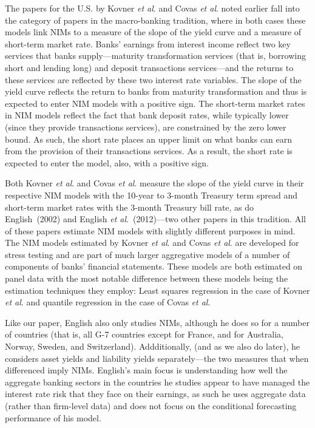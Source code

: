 \documentclass[11pt]{article}
\begin{document}
The papers for the U.S. by Kovner \textit{et al}. and Covas \textit{et al}. noted earlier fall into the category of papers in the macro-banking tradition, where in both cases these models link NIMs to  a measure of the slope of the yield curve and a measure of short-term market rate.  Banks' earnings from interest income reflect two key services that banks supply---maturity transformation services (that is, borrowing short and lending long) and deposit transactions services---and the returns to these services are reflected by these two interest rate variables.  The slope of the yield curve reflects the return to banks from maturity transformation and thus is expected to enter NIM models with a positive sign. The short-term market rates in NIM models reflect the fact that bank deposit rates, while typically lower (since they provide transactions services), are constrained by the zero lower bound.  As such, the short rate places an upper limit on what banks can earn from the provision of their transactions services. As a result, the short rate is expected to enter the model, also, with a positive sign.

Both Kovner \textit{et al}. and Covas \textit{et al}. measure the slope of the yield curve in their respective NIM models with the 10-year to 3-month Treasury term spread and short-term market rates with the 3-month Treasury bill rate, as do English~(2002) and English \textit{et al}.~(2012)---two other papers in this tradition.  All of these papers estimate NIM models with slightly different purposes in mind.  The NIM models estimated by Kovner \textit{et al}. and Covas \textit{et al}. are developed for stress testing and are part of much larger aggregative models of a number of components of banks' financial statements. These models are both estimated on panel data with the most notable difference between these models being the estimation techniques they employ: Least squares regression in the case of Kovner \textit{et al}. and quantile regression in the case of Covas \textit{et al}.

Like our paper, English also only studies NIMs, although he does so for a number of countries (that is, all G-7 countries except for France, and for Australia, Norway, Sweden, and Switzerland).  Addditionally, (and as we also do later), he considers asset yields and liability yields separately---the two measures that when differenced imply NIMs.  English's main focus is understanding how well the aggregate banking sectors in the countries he studies appear to have managed the interest rate risk that they face on their earnings, as such he uses aggregate data (rather than firm-level data) and does not focus on the conditional forecasting performance of his model.
\end{document}
